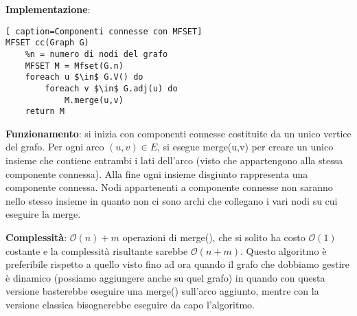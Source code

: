 \documentclass[../cheatSheetAlgoritmi.tex]{subfiles}
\begin{document}
\bigskip

\textbf{Implementazione}:
\begin{lstlisting}[ caption=Componenti connesse con MFSET]
MFSET cc(Graph G)
	%n = numero di nodi del grafo
	MFSET M = Mfset(G.n)
	foreach u $\in$ G.V() do
		foreach v $\in$ G.adj(u) do
			M.merge(u,v)
	return M
\end{lstlisting} 

\bigskip

\textbf{Funzionamento}: si inizia con componenti connesse costituite da un unico vertice del grafo. Per ogni arco $(u,v) \in E$, si esegue merge(u,v) per creare un unico insieme che contiene entrambi i lati dell'arco (visto che appartengono alla stessa componente connessa). Alla fine ogni insieme disgiunto rappresenta una componente connessa. Nodi appartenenti a componente connesse non saranno nello stesso insieme in quanto non ci sono archi che collegano i vari nodi su cui eseguire la merge.

\bigskip

\textbf{Complessità}: $\mathcal{O}(n) + m$ operazioni di merge(), che si solito ha costo $\mathcal{O}(1)$ costante e la complessità risultante sarebbe $\mathcal{O}(n+m)$. Questo algoritmo è preferibile rispetto a quello visto fino ad ora quando il grafo che dobbiamo gestire è dinamico (possiamo aggiungere anche su quel grafo) in quando con questa versione basterebbe eseguire una merge() sull'arco aggiunto, mentre con la versione classica bisognerebbe eseguire da capo l'algoritmo. 
 
\end{document}
